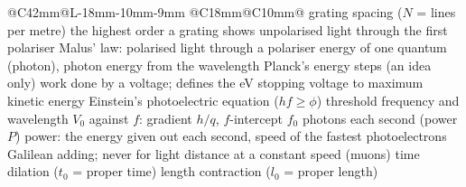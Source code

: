 {\begin{longtable}{@{}C{42mm}@{\hspace{3mm}}L{\dimexpr\linewidth-42mm-18mm-10mm-9mm\relax}%
    @{\hspace{3mm}}C{18mm}@{\hspace{3mm}}C{10mm}@{}}
    {grating spacing ($N$ = lines per metre)}{}
    {the highest order a grating shows}{}
    {unpolarised light through the first polariser}{}
    {Malus' law: polarised light through a polariser}{}
  \essfsnext
    {energy of one quantum (photon)}{, }
    {photon energy from the wavelength}{}
    {Planck's energy steps (an idea only)}{}
    {work done by a voltage; defines the eV}{}
    {stopping voltage to maximum kinetic energy}{}
    {Einstein's photoelectric equation ($hf \ge \phi$)}{}
    {threshold frequency and wavelength}{}
    {$V_0$ against $f$: gradient $h/q$, $f$-intercept $f_0$}{}
    {photons each second (power $P$)}{}
    {power: the energy given out each second}{, }
    {speed of the fastest photoelectrons}{}
  \essfsnext
    {Galilean adding; never for light}{}
    {distance at a constant speed (muons)}{}
    {time dilation ($t_0$ = proper time)}{}
    {length contraction ($l_0$ = proper length)}{}

\end{longtable}}
